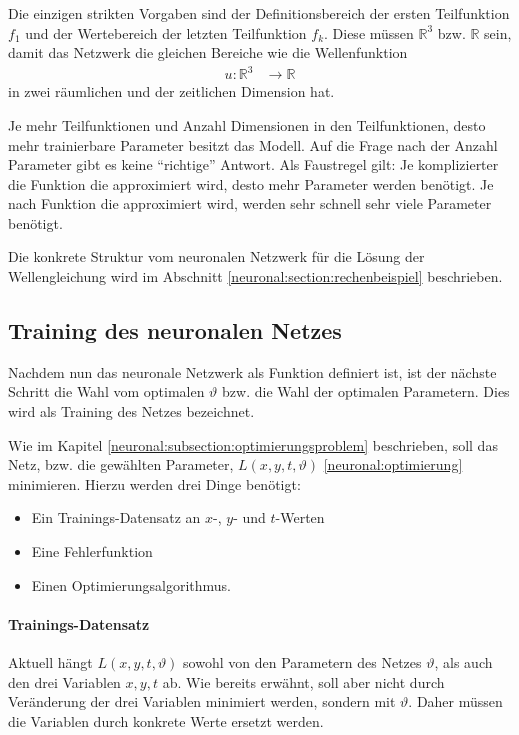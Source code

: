 Die einzigen strikten Vorgaben sind der Definitionsbereich der ersten Teilfunktion \( f_1 \) und der Wertebereich der letzten Teilfunktion \( f_k \).
Diese müssen \( \mathbb{R}^3 \) bzw. \( \mathbb{R} \) sein, damit das Netzwerk die gleichen Bereiche wie die Wellenfunktion
\begin{align*}
    u\colon \mathbb{R}^3 & \longrightarrow\mathbb{R}
\end{align*}
in zwei räumlichen und der zeitlichen Dimension hat.

Je mehr Teilfunktionen und Anzahl Dimensionen in den Teilfunktionen, desto mehr trainierbare Parameter besitzt das Modell.
Auf die Frage nach der Anzahl Parameter gibt es keine ``richtige'' Antwort.
Als Faustregel gilt: Je komplizierter die Funktion die approximiert wird, desto mehr Parameter werden benötigt.
Je nach Funktion die approximiert wird, werden sehr schnell sehr viele Parameter benötigt.

Die konkrete Struktur vom neuronalen Netzwerk für die Lösung der Wellengleichung wird im Abschnitt \ref{neuronal:section:rechenbeispiel} beschrieben.


\subsection{Training des neuronalen Netzes}\label{neuronal:subsection:training_nn}

Nachdem nun das neuronale Netzwerk als Funktion definiert ist, ist der nächste Schritt die Wahl vom optimalen \( \vartheta \) bzw. die Wahl der optimalen Parametern.
Dies wird als Training des Netzes bezeichnet.

Wie im Kapitel \ref{neuronal:subsection:optimierungsproblem} beschrieben, soll das Netz, bzw. die gewählten Parameter, \( L(x, y, t, \vartheta) \) \eqref{neuronal:optimierung} minimieren.
Hierzu werden drei Dinge benötigt:
\begin{itemize}
    \item Ein Trainings-Datensatz an \( x \)-, \( y \)- und \( t \)-Werten
    \item Eine Fehlerfunktion
    \item Einen Optimierungsalgorithmus.
\end{itemize}

\paragraph{Trainings-Datensatz}

Aktuell hängt \( L(x, y, t, \vartheta) \) sowohl von den Parametern des Netzes \( \vartheta \), als auch den drei Variablen \( x, y, t \) ab.
Wie bereits erwähnt, soll aber nicht durch Veränderung der drei Variablen minimiert werden, sondern mit \( \vartheta \).
Daher müssen die Variablen durch konkrete Werte ersetzt werden.

